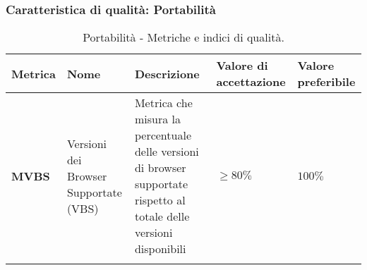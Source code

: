 \subsubsection{Caratteristica di qualità: Portabilità}
\hspace{1pt}
            \begin{longtable}{|C{1.5cm}|L{3cm}|L{4cm}|L{2.5cm}|L{2.5cm}|}
                    \hline
                    \textbf{Metrica} & \textbf{Nome} & \textbf{Descrizione} & \textbf{Valore di accettazione} & \textbf{Valore preferibile} \\
                    \hline
                    \textbf{MVBS} & Versioni dei Browser Supportate (VBS) & Metrica che misura la percentuale delle versioni di browser supportate rispetto al totale delle versioni disponibili & $\geq 80\%$ & $100\%$ \\
                    \hline
                    \caption{Portabilità - Metriche e indici di qualità.}
                \label{tab:metriche_portabilità_testo}
            \end{longtable}